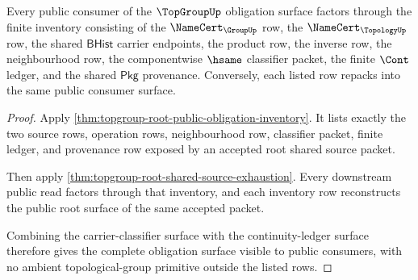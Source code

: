 \begin{theorem}
\label{thm:topgroup-obligation-public-consumer-exhaustion}
Every public consumer of the $\TopGroupUp$ obligation surface factors through
the finite inventory consisting of the $\NameCert_{\GroupUp}$ row, the
$\NameCert_{\TopologyUp}$ row, the shared $\mathsf{BHist}$ carrier endpoints,
the product row, the inverse row, the neighbourhood row, the componentwise
$\hsame$ classifier packet, the finite $\Cont$ ledger, and the shared
$\mathsf{Pkg}$ provenance. Conversely, each listed row repacks into the same
public consumer surface.
\end{theorem}
\begin{proof}
Apply \autoref{thm:topgroup-root-public-obligation-inventory}. It lists exactly
the two source rows, operation rows, neighbourhood row, classifier packet,
finite ledger, and provenance row exposed by an accepted root shared source
packet.

Then apply \autoref{thm:topgroup-root-shared-source-exhaustion}. Every
downstream public read factors through that inventory, and each inventory row
reconstructs the public root surface of the same accepted packet.

Combining the carrier-classifier surface with the continuity-ledger surface
therefore gives the complete obligation surface visible to public consumers,
with no ambient topological-group primitive outside the listed rows.
\end{proof}

